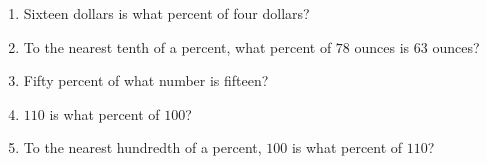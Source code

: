 \documentclass[12pt]{article}
\begin{document}
\begin{enumerate}
\item Sixteen dollars is what percent of four dollars?
  \vspace{0.50in}

\item To the nearest tenth of a percent, what percent of $78$ ounces is $63$ ounces?
  \vspace{0.50in}

\item Fifty percent of what number is fifteen? 
  \vspace{0.50in}

\item $110$ is what percent of $100$? 
  \vspace{0.50in}

\item To the nearest hundredth of a percent, $100$ is what percent of $110$? 
  \vspace{0.50in}

\end{enumerate}
\end{document}
